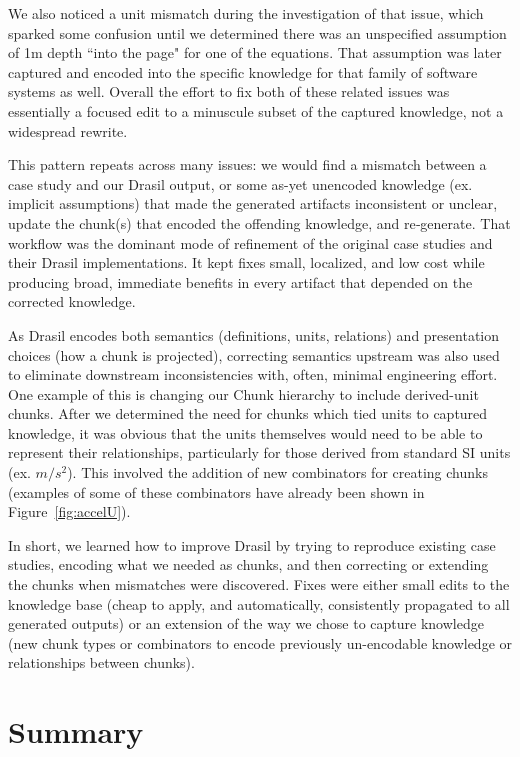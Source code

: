 We also noticed a unit mismatch during the investigation of that issue, which 
sparked some confusion until we determined there was an unspecified assumption 
of 1m depth ``into the page" for one of the equations. That assumption was 
later captured and encoded into the specific knowledge for that family of 
software systems as well. Overall the effort to fix both of these related 
issues was essentially a focused edit to a minuscule subset of the captured 
knowledge, not a widespread rewrite.

This pattern repeats across many issues: we would find a mismatch between a
case study and our Drasil output, or some as-yet unencoded knowledge (ex. 
implicit assumptions) that made the generated artifacts inconsistent or 
unclear, update the chunk(s) that encoded the offending knowledge, and 
re‑generate. That workflow was the dominant mode of refinement of the original 
case studies and their Drasil implementations. It kept fixes small, localized, 
and low cost while producing broad, immediate benefits in every artifact that 
depended on the corrected knowledge.

As Drasil encodes both semantics (definitions, units, relations) and 
presentation choices (how a chunk is projected), correcting semantics upstream 
was also used to eliminate downstream inconsistencies with, often, minimal 
engineering effort. One example of this is changing our Chunk hierarchy to 
include derived-unit chunks. After we determined the need for  
chunks which tied units to captured knowledge, it was obvious that the units 
themselves would need to be able to represent their relationships, particularly 
for those derived from standard SI units (ex. $m/s^2$). This involved the 
addition of new combinators for creating  chunks (examples of 
some of these combinators have already been shown in Figure~\ref{fig:accelU}).

In short, we learned how to improve Drasil by trying to reproduce existing case 
studies, encoding what we needed as chunks, and then correcting or extending 
the chunks when mismatches were discovered. Fixes were either small edits to 
the knowledge base (cheap to apply, and automatically, consistently propagated 
to all generated outputs) or an extension of the way we chose to capture 
knowledge (new chunk types or combinators to encode previously un-encodable 
knowledge or relationships between chunks).

\section{Summary}

